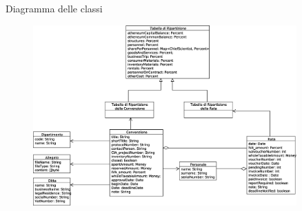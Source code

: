   \begin{frame}{Diagramma delle classi}
  
    \begin{figure}[h]
      \label{business_model}
      \centering
      \includegraphics[width=0.9\textwidth]{images/modello_business_simplified.eps}
    \end{figure}
   
  \end{frame}


  
  



